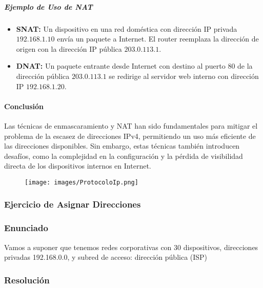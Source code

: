 \documentclass[a4paper,12pt]{article}
\begin{document}
\subparagraph{Ejemplo de Uso de NAT}
\begin{itemize}
    \item \textbf{SNAT:} Un dispositivo en una red doméstica con dirección IP privada \( 192.168.1.10 \) envía un paquete a Internet. El router reemplaza la dirección de origen con la dirección IP pública \( 203.0.113.1 \).
    \item \textbf{DNAT:} Un paquete entrante desde Internet con destino al puerto 80 de la dirección pública \( 203.0.113.1 \) se redirige al servidor web interno con dirección IP \( 192.168.1.20 \).
\end{itemize}

\paragraph{Conclusión}

Las técnicas de enmascaramiento y NAT han sido fundamentales para mitigar el problema de la escasez de direcciones IPv4, permitiendo un uso más eficiente de las direcciones disponibles. Sin embargo, estas técnicas también introducen desafíos, como la complejidad en la configuración y la pérdida de visibilidad directa de los dispositivos internos en Internet.

\begin{figure}[H]
    \centering
    \texttt{[image: images/ProtocoloIp.png]}
\end{figure}

\subsubsection{Ejercicio de Asignar Direcciones}

\subsubsection*{Enunciado}
Vamos a suponer que tenemos redes corporativas con 30 dispositivos, direcciones privadas 192.168.0.0, y subred de acceso: dirección pública (ISP)

\subsubsection*{Resolución}
\end{document}
